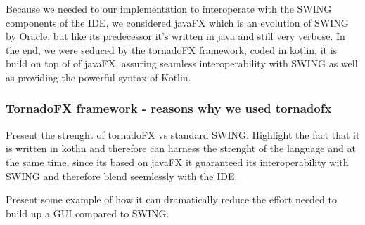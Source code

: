  	Because we needed to our implementation to interoperate with the SWING components of the IDE, we considered javaFX \cite{oracle_javafx} which is an evolution of SWING by Oracle, but like its predecessor it's written in java and still very verbose. In the end, we were seduced by the tornadoFX \cite{tornadofx} framework, coded in kotlin, it is build on top of of javaFX, assuring seamless interoperability with SWING as well as providing the powerful syntax of Kotlin.

		\subsubsection{TornadoFX framework - reasons why we used tornadofx}
		Present the strenght of tornadoFX vs standard SWING. Highlight the fact that it is written in kotlin and therefore can harness the strenght of the language and at the same time, since its based on javaFX it guaranteed its interoperability with SWING and therefore blend seemlessly with the IDE.

		Present some example of how it can dramatically reduce the effort needed to build up a GUI compared to SWING.

